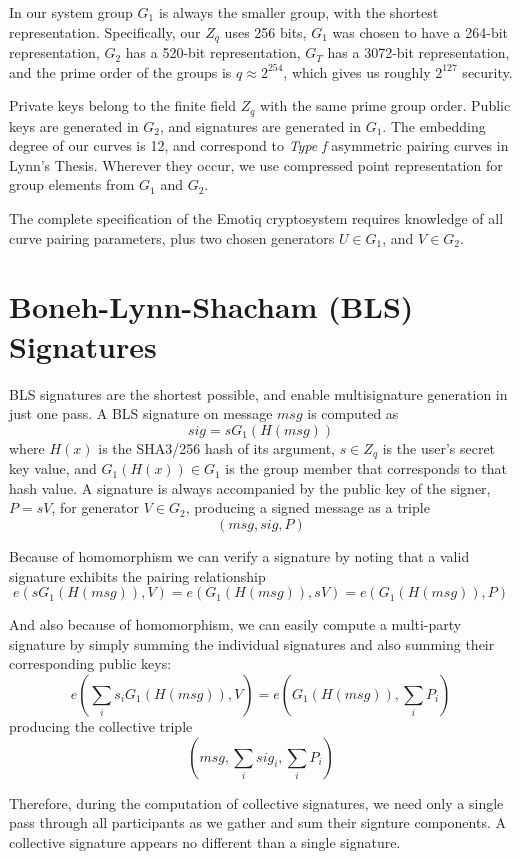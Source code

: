 \documentclass[article,oneside]{memoir}
\begin{document}
In our system group $G_1$ is always the smaller group, with the shortest representation. Specifically, our $Z_q$ uses 256 bits, $G_1$ was chosen to have a 264-bit representation, $G_2$ has a 520-bit representation, $G_T$ has a 3072-bit representation, and the prime order of the groups is $q \approx  2^{254}$, which gives us roughly $2^{127}$ security.

Private keys belong to the finite field $Z_q$ with the same prime group order. Public keys are generated in $G_2$, and signatures are generated in $G_1$. The embedding degree of our curves is 12, and correspond to {\emph{Type f}} asymmetric pairing curves in Lynn's Thesis\cite{thesis}. Wherever they occur, we use  compressed point representation for group elements from $G_1$ and $G_2$.

The complete specification of the Emotiq cryptosystem requires knowledge of all curve pairing parameters, plus two chosen generators $U \in G_1$, and $V \in G_2$.

\chapter{Boneh-Lynn-Shacham (BLS) Signatures}

BLS signatures are the shortest possible, and enable multisignature generation in just one pass. A BLS signature on message $msg$ is computed as $$sig = s G_1(H(msg))$$ where $H(x)$ is the SHA3/256 hash of its argument, $s \in Z_q$ is the user's secret key value, and $G_1(H(x)) \in G_1$ is the group member that corresponds to that hash value. A signature is always accompanied by the public key of the signer, $P = s V$, for generator $V \in G_2$,  producing a signed message as a triple $$(msg, sig, P)$$

Because of homomorphism we can verify a signature by noting that a valid signature exhibits the pairing relationship $$e(s  G_1(H(msg)),V) = e(G_1(H(msg)), s V) = e(G_1(H(msg)), P)$$

And also because of homomorphism, we can easily compute a multi-party signature by simply summing the individual signatures and also summing their corresponding public keys: $$e({\sum_i s_i} G_1(H(msg)),V) = e(G_1(H(msg)), {\sum_i P_i})$$ producing the collective triple $$(msg, {\sum_i sig_i}, {\sum_i P_i})$$

Therefore, during the computation of collective signatures, we need only a single pass through all participants as we gather and sum their signture components. A collective signature appears no different than a single signature.
\end{document}
